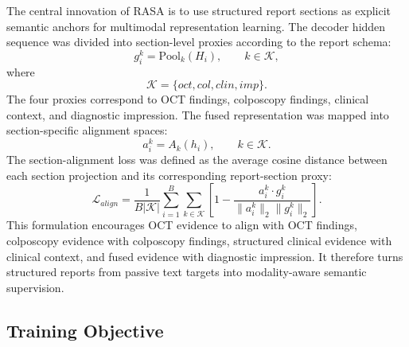 The central innovation of RASA is to use structured report sections as explicit semantic anchors for multimodal representation learning. The decoder hidden sequence was divided into section-level proxies according to the report schema:
\begin{equation}
g_i^k=\mathrm{Pool}_{k}(H_i),\qquad k\in\mathcal{K},
\end{equation}
where
\begin{equation}
\mathcal{K}=\{oct,col,clin,imp\}.
\end{equation}
The four proxies correspond to OCT findings, colposcopy findings, clinical context, and diagnostic impression. The fused representation was mapped into section-specific alignment spaces:
\begin{equation}
a_i^{k}=A_k(h_i),\qquad k\in\mathcal{K}.
\end{equation}
The section-alignment loss was defined as the average cosine distance between each section projection and its corresponding report-section proxy:
\begin{equation}
\mathcal{L}_{align}
=
\frac{1}{B|\mathcal{K}|}
\sum_{i=1}^{B}
\sum_{k\in\mathcal{K}}
\left[
1-
\frac{a_i^{k}\cdot g_i^{k}}{\|a_i^{k}\|_2\|g_i^{k}\|_2}
\right].
\end{equation}
This formulation encourages OCT evidence to align with OCT findings, colposcopy evidence with colposcopy findings, structured clinical evidence with clinical context, and fused evidence with diagnostic impression. It therefore turns structured reports from passive text targets into modality-aware semantic supervision.

\subsection{Training Objective}
\label{subsec:methods_objective}

